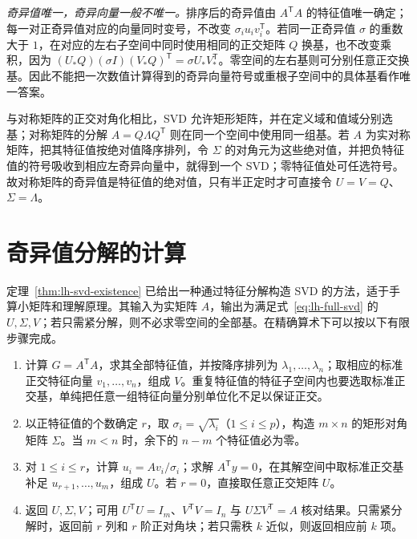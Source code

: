 \emph{奇异值唯一，奇异向量一般不唯一。}排序后的奇异值由 $A^{\mathsf T}A$ 的特征值唯一确定；每一对正奇异值对应的向量同时变号，不改变 $\sigma_i u_iv_i^{\mathsf T}$。若同一正奇异值 $\sigma$ 的重数大于 $1$，在对应的左右子空间中同时使用相同的正交矩阵 $Q$ 换基，也不改变乘积，因为 $(U_*Q)(\sigma I)(V_*Q)^{\mathsf T}=\sigma U_*V_*^{\mathsf T}$。零空间的左右基则可分别任意正交换基。因此不能把一次数值计算得到的奇异向量符号或重根子空间中的具体基看作唯一答案。

与对称矩阵的正交对角化相比，SVD 允许矩形矩阵，并在定义域和值域分别选基；对称矩阵的分解 $A=Q\Lambda Q^{\mathsf T}$ 则在同一个空间中使用同一组基。若 $A$ 为实对称矩阵，把其特征值按绝对值降序排列，令 $\Sigma$ 的对角元为这些绝对值，并把负特征值的符号吸收到相应左奇异向量中，就得到一个 SVD；零特征值处可任选符号。故对称矩阵的奇异值是特征值的绝对值，只有半正定时才可直接令 $U=V=Q$、$\Sigma=\Lambda$。

\section{奇异值分解的计算}
\label{sec:lh-svd-computation}

定理~\ref{thm:lh-svd-existence} 已给出一种通过特征分解构造 SVD 的方法，适于手算小矩阵和理解原理。其输入为实矩阵 $A$，输出为满足式~\eqref{eq:lh-full-svd} 的 $U,\Sigma,V$；若只需紧分解，则不必求零空间的全部基。在精确算术下可以按以下有限步骤完成。
\begin{enumerate}
\item 计算 $G=A^{\mathsf T}A$，求其全部特征值，并按降序排列为 $\lambda_1,\ldots,\lambda_n$；取相应的标准正交特征向量 $v_1,\ldots,v_n$，组成 $V$。重复特征值的特征子空间内也要选取标准正交基，单纯把任意一组特征向量分别单位化不足以保证正交。
\item 以正特征值的个数确定 $r$，取 $\sigma_i=\sqrt{\lambda_i}$（$1\leq i\leq p$），构造 $m\times n$ 的矩形对角矩阵 $\Sigma$。当 $m<n$ 时，余下的 $n-m$ 个特征值必为零。
\item 对 $1\leq i\leq r$，计算 $u_i=Av_i/\sigma_i$；求解 $A^{\mathsf T}y=0$，在其解空间中取标准正交基补足 $u_{r+1},\ldots,u_m$，组成 $U$。若 $r=0$，直接取任意正交矩阵 $U$。
\item 返回 $U,\Sigma,V$；可用 $U^{\mathsf T}U=I_m$、$V^{\mathsf T}V=I_n$ 与 $U\Sigma V^{\mathsf T}=A$ 核对结果。只需紧分解时，返回前 $r$ 列和 $r$ 阶正对角块；若只需秩 $k$ 近似，则返回相应前 $k$ 项。
\end{enumerate}


